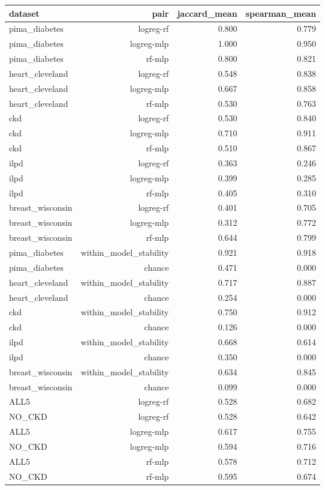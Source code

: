 \begin{tabular}{lrrr}
\toprule
dataset & pair & jaccard\_mean & spearman\_mean \\
\midrule
pima\_diabetes & logreg-rf & 0.800 & 0.779 \\
pima\_diabetes & logreg-mlp & 1.000 & 0.950 \\
pima\_diabetes & rf-mlp & 0.800 & 0.821 \\
heart\_cleveland & logreg-rf & 0.548 & 0.838 \\
heart\_cleveland & logreg-mlp & 0.667 & 0.858 \\
heart\_cleveland & rf-mlp & 0.530 & 0.763 \\
ckd & logreg-rf & 0.530 & 0.840 \\
ckd & logreg-mlp & 0.710 & 0.911 \\
ckd & rf-mlp & 0.510 & 0.867 \\
ilpd & logreg-rf & 0.363 & 0.246 \\
ilpd & logreg-mlp & 0.399 & 0.285 \\
ilpd & rf-mlp & 0.405 & 0.310 \\
breast\_wisconsin & logreg-rf & 0.401 & 0.705 \\
breast\_wisconsin & logreg-mlp & 0.312 & 0.772 \\
breast\_wisconsin & rf-mlp & 0.644 & 0.799 \\
pima\_diabetes & within\_model\_stability & 0.921 & 0.918 \\
pima\_diabetes & chance & 0.471 & 0.000 \\
heart\_cleveland & within\_model\_stability & 0.717 & 0.887 \\
heart\_cleveland & chance & 0.254 & 0.000 \\
ckd & within\_model\_stability & 0.750 & 0.912 \\
ckd & chance & 0.126 & 0.000 \\
ilpd & within\_model\_stability & 0.668 & 0.614 \\
ilpd & chance & 0.350 & 0.000 \\
breast\_wisconsin & within\_model\_stability & 0.634 & 0.845 \\
breast\_wisconsin & chance & 0.099 & 0.000 \\
ALL5 & logreg-rf & 0.528 & 0.682 \\
NO\_CKD & logreg-rf & 0.528 & 0.642 \\
ALL5 & logreg-mlp & 0.617 & 0.755 \\
NO\_CKD & logreg-mlp & 0.594 & 0.716 \\
ALL5 & rf-mlp & 0.578 & 0.712 \\
NO\_CKD & rf-mlp & 0.595 & 0.674 \\
\bottomrule
\end{tabular}
